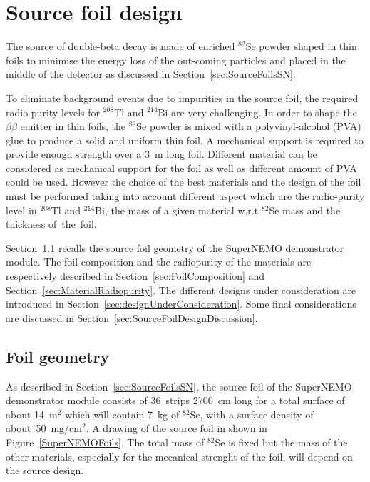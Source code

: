 \documentclass[main.tex]{subfiles}
\begin{document}
\bigskip


\section{Source foil design}\label{sec:SourceFoilDesign}


\NI The source of double-beta decay is made of enriched $^{\text{82}}$Se powder shaped in thin foils to minimise the energy loss of the out-coming particles and placed in the middle of the detector as discussed in Section~\ref{sec:SourceFoilsSN}.


\bigskip


\NI To eliminate background events due to impurities in the source foil, the required radio-purity levels for $^{\text{208}}$Tl and $^{\text{214}}$Bi are very challenging. In order to shape the $\beta\beta$ emitter in thin foils, the $^{\text{82}}$Se powder is mixed with a polyvinyl-alcohol (PVA) glue to produce a solid and uniform thin foil. A mechanical support is required to provide enough strength over a 3~m long foil. Different material can be considered as mechanical support for the foil as well as different amount of PVA could be used. However the choice of the best materials and the design of the foil must be performed taking into account different aspect which are the radio-purity level in $^{\text{208}}$Tl and $^{\text{214}}$Bi, the mass of a given material w.r.t $^{\text{82}}$Se mass and the thickness of~the~foil.


\bigskip


\NI Section~\ref{sec:FoilGeometry} recalls the source foil geometry of the SuperNEMO demonstrator module. The foil composition and the radiopurity of the materials are respectively described in Section~\ref{sec:FoilComposition} and Section~\ref{sec:MaterialRadiopurity}. The different designs under consideration are introduced in Section~\ref{sec:designUnderConsideration}. Some final considerations are discussed in Section~\ref{sec:SourceFoilDesignDiscussion}.


\subsection{Foil geometry}\label{sec:FoilGeometry}


\NI As described in Section~\ref{sec:SourceFoilsSN}, the source foil of the SuperNEMO demonstrator module consists of 36~strips 2700~cm long for a total surface of about 14~m$^\text{2}$ which will contain 7~kg of $^{\text{82}}$Se, with a surface density of about~50~mg/cm$^\text{2}$. A drawing of the source foil in shown in Figure~\ref{SuperNEMOFoils}. The total mass of $^{\text{82}}$Se is fixed but the mass of the other materials, especially for the mecanical strenght of the foil, will depend on the source design.
\end{document}
